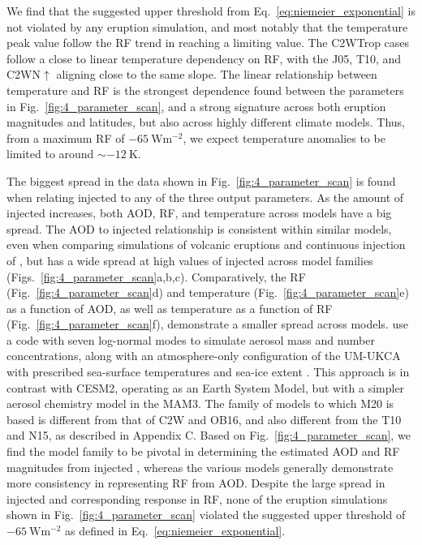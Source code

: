 \documentclass[draft]{agujournal2019}
\begin{document}
We find that the suggested upper threshold from Eq.~\ref{eq:niemeier_exponential} is not
violated by any eruption simulation, and most notably that the temperature peak value
follow the RF trend in reaching a limiting value. The C2WTrop cases follow a close to
linear temperature dependency on RF, with the J05, T10, and C2WN\(\uparrow\) aligning
close to the same slope. The linear relationship between temperature and RF is the
strongest dependence found between the parameters in Fig.~\ref{fig:4_parameter_scan},
and a strong signature across both eruption magnitudes and latitudes, but also across
highly different climate models. Thus, from a maximum RF of
\(\SI{-65}{\watt\metre^{-2}}\), we expect temperature anomalies to be limited to around
\(\sim\SI{-12}{\kelvin}\).

The biggest spread in the data shown in Fig.~\ref{fig:4_parameter_scan} is found when
relating injected  to any of the three output parameters. As the amount of
injected  increases, both AOD, RF, and temperature across models have a big
spread. The AOD to injected  relationship is consistent within similar models,
even when comparing simulations of volcanic eruptions \cite{timmreck2010} and continuous
injection of  \cite{niemeier2015}, but has a wide spread at high values of
injected  across model families (Figs.~\ref{fig:4_parameter_scan}a,b,c).
Comparatively, the RF (Fig.~\ref{fig:4_parameter_scan}d) and temperature
(Fig.~\ref{fig:4_parameter_scan}e) as a function of AOD, as well as temperature as a
function of RF (Fig.~\ref{fig:4_parameter_scan}f), demonstrate a smaller spread across
models.  use a code with seven
log-normal modes to simulate aerosol mass and number concentrations, along with an
atmosphere-only configuration of the UM-UKCA with prescribed sea-surface temperatures
and sea-ice extent \cite{marshall2019}. This approach is in contrast with CESM2,
operating as an Earth System Model, but with a simpler aerosol chemistry model in the
MAM3. The family of models to which M20 is based is different from that of C2W and OB16,
and also different from the T10 and N15, as described in Appendix C. Based on
Fig.~\ref{fig:4_parameter_scan}, we find the model family to be pivotal in determining
the estimated AOD and RF magnitudes from injected , whereas the various models
generally demonstrate more consistency in representing RF from AOD. Despite the large
spread in injected  and corresponding response in RF, none of the eruption
simulations shown in Fig.~\ref{fig:4_parameter_scan} violated the suggested upper
threshold of \(\SI{-65}{\watt\metre^{-2}}\) as defined in
Eq.~\ref{eq:niemeier_exponential}.
\end{document}

